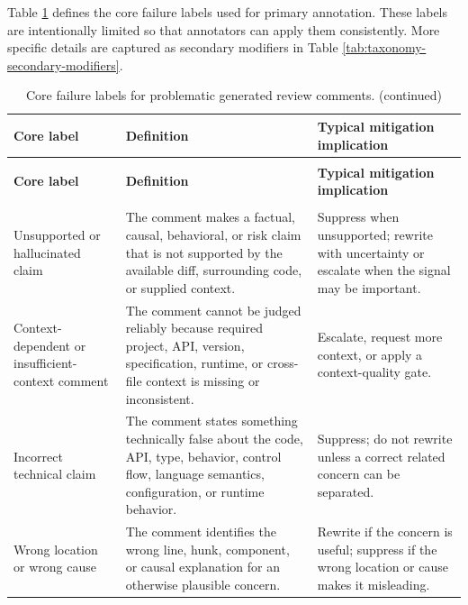 \documentclass[10pt]{article}
\begin{document}
Table \ref{tab:problematic-comment-taxonomy} defines the core failure labels used for primary annotation. These labels are intentionally limited so that annotators can apply them consistently. More specific details are captured as secondary modifiers in Table \ref{tab:taxonomy-secondary-modifiers}.

\begingroup
\footnotesize
\renewcommand{\arraystretch}{1.18}
\begin{longtable}{@{}>{\raggedright\arraybackslash}p{}>{\raggedright\arraybackslash}p{}>{\raggedright\arraybackslash}p{}@{}}
\caption{Core failure labels for problematic generated review comments.}\label{tab:problematic-comment-taxonomy} \\
\toprule
\rowcolor{ACMTableHead}
\textbf{Core label} & \textbf{Definition} & \textbf{Typical mitigation implication} \\
\midrule
\endfirsthead
\caption[]{Core failure labels for problematic generated review comments. (continued)} \\
\toprule
\rowcolor{ACMTableHead}
\textbf{Core label} & \textbf{Definition} & \textbf{Typical mitigation implication} \\
\midrule
\endhead
\midrule
\multicolumn{3}{r}{Continued on next page} \\
\endfoot
\bottomrule
\endlastfoot
Unsupported or hallucinated claim & The comment makes a factual, causal, behavioral, or risk claim that is not supported by the available diff, surrounding code, or supplied context. & Suppress when unsupported; rewrite with uncertainty or escalate when the signal may be important. \\
Context-dependent or insufficient-context comment & The comment cannot be judged reliably because required project, API, version, specification, runtime, or cross-file context is missing or inconsistent. & Escalate, request more context, or apply a context-quality gate. \\
Incorrect technical claim & The comment states something technically false about the code, API, type, behavior, control flow, language semantics, configuration, or runtime behavior. & Suppress; do not rewrite unless a correct related concern can be separated. \\
Wrong location or wrong cause & The comment identifies the wrong line, hunk, component, or causal explanation for an otherwise plausible concern. & Rewrite if the concern is useful; suppress if the wrong location or cause makes it misleading. \\

\end{longtable}
\end{document}
